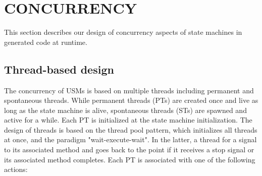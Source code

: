 \section{\uppercase{Concurrency}}
\label{sec:thread}
This section describes our design of concurrency aspects of state machines in generated code at runtime. 

%
\subsection{Thread-based design}
The concurrency of USMs is based on multiple threads including permanent and spontaneous threads. 
While permanent threads (PTs) are created once and live as long as the state machine is alive, spontaneous threads (STs) are spawned and active for a while. 
Each PT is initialized at the state machine initialization. 
The design of threads is based on the thread pool pattern, which initializes all threads at once, and the paradigm "wait-execute-wait". 
In the latter, a thread  for a signal to  its associated method and goes back to the  point if it receives a stop signal or its associated method completes. 
Each PT is associated with one of the following actions:

